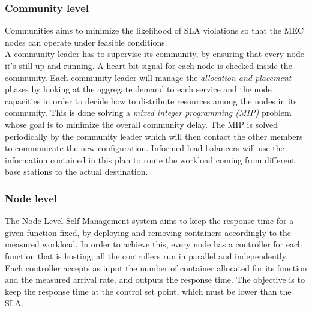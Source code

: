 \begin{figure}[h]
    \centering
    \label{fig:pseudocode}
    \label{fig:communities}
\end{figure}

\subsubsection*{Community level}
Communities aims to minimize the likelihood of SLA violations so that the MEC nodes
can operate under feasible conditions.\\
A community leader has to supervise its community, by ensuring that every node it's still up and running.
A heart-bit signal for each node is checked inside the community.
Each community leader will manage the \textit{allocation and placement} phases by looking at 
the aggregate demand to each service and the node capacities in order to decide how to 
distribute resources among the nodes in its community. This is done solving a \textit{mixed
integer programming (MIP)} problem whose goal is to minimize the overall community delay. 
The MIP is solved periodically by the community leader which will then contact the other members
to communicate the new configuration.
Informed load balancers will use the information contained in this plan to route the workload 
coming from different base stations to the actual destination.

\subsubsection*{Node level}
The Node-Level Self-Management system aims to keep the response time for a given function fixed, 
by deploying and removing containers accordingly to the measured workload.
In order to achieve this, every node has a controller for each function that is hosting; all the controllers
run in parallel and independently.
Each controller accepts as input the number of container allocated for its function and the 
measured arrival rate, and outputs the response time. The objective is to keep the response time
at the control set point, which must be lower than the SLA.
